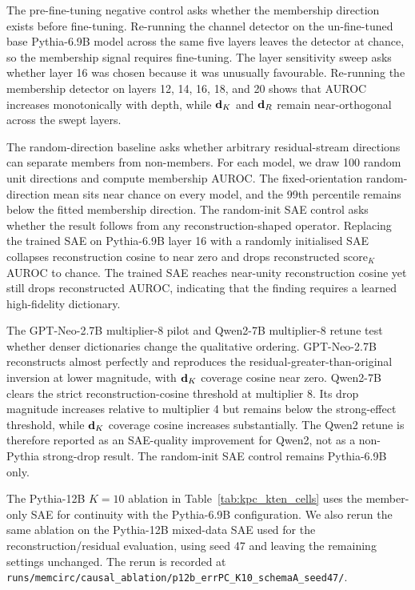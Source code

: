 The pre-fine-tuning negative control asks whether the membership direction exists before fine-tuning. Re-running the channel detector on the un-fine-tuned base Pythia-6.9B model across the same five layers leaves the detector at chance, so the membership signal requires fine-tuning. The layer sensitivity sweep asks whether layer 16 was chosen because it was unusually favourable. Re-running the membership detector on layers 12, 14, 16, 18, and 20 shows that AUROC increases monotonically with depth, while $\mathbf{d}_K$ and $\mathbf{d}_R$ remain near-orthogonal across the swept layers.

The random-direction baseline asks whether arbitrary residual-stream directions can separate members from non-members. For each model, we draw 100 random unit directions and compute membership AUROC. The fixed-orientation random-direction mean sits near chance on every model, and the 99th percentile remains below the fitted membership direction. The random-init SAE control asks whether the result follows from any reconstruction-shaped operator. Replacing the trained SAE on Pythia-6.9B layer 16 with a randomly initialised SAE collapses reconstruction cosine to near zero and drops reconstructed $\mathrm{score}_K$ AUROC to chance. The trained SAE reaches near-unity reconstruction cosine yet still drops reconstructed AUROC, indicating that the finding requires a learned high-fidelity dictionary.

The GPT-Neo-2.7B multiplier-8 pilot and Qwen2-7B multiplier-8 retune test whether denser dictionaries change the qualitative ordering. GPT-Neo-2.7B reconstructs almost perfectly and reproduces the residual-greater-than-original inversion at lower magnitude, with $\mathbf{d}_K$ coverage cosine near zero. Qwen2-7B clears the strict reconstruction-cosine threshold at multiplier 8. Its drop magnitude increases relative to multiplier 4 but remains below the strong-effect threshold, while $\mathbf{d}_K$ coverage cosine increases substantially. The Qwen2 retune is therefore reported as an SAE-quality improvement for Qwen2, not as a non-Pythia strong-drop result. The random-init SAE control remains Pythia-6.9B only.

The Pythia-12B $K=10$ ablation in Table~\ref{tab:kpc_kten_cells} uses the member-only SAE for continuity with the Pythia-6.9B configuration. We also rerun the same ablation on the Pythia-12B mixed-data SAE used for the reconstruction/residual evaluation, using seed 47 and leaving the remaining settings unchanged. The rerun is recorded at \texttt{runs/\allowbreak{}memcirc/\allowbreak{}causal\_\allowbreak{}ablation/\allowbreak{}p12b\_\allowbreak{}errPC\_\allowbreak{}K10\_\allowbreak{}schemaA\_\allowbreak{}seed47/\allowbreak{}}.

